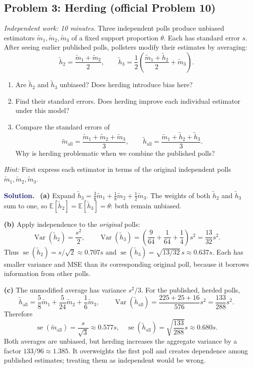 \documentclass[11pt]{article}
\newcommand{\rv}[1]{\widetilde{#1}}
\newcommand{\E}{\mathbb E}
\newcommand{\Var}{\operatorname{Var}}
\newcommand{\se}{\operatorname{se}}
\newenvironment{answer}{\par\medskip\noindent\textcolor{MidnightBlue}{\textbf{Solution.}}\ }{\par\medskip}
\newcommand{\workingspace}[1]{}
\newcommand{\workingspace}[1]{\vspace{#1}}
\begin{document}
\newpage
\subsection*{Problem 3: Herding (official Problem 10)}
\noindent\textit{Independent work: 10 minutes.}
Three independent polls produce unbiased estimators
$\rv m_1,\rv m_2,\rv m_3$ of a fixed support proportion $\theta$.
Each has standard error $s$. After seeing earlier published polls,
pollsters modify their estimates by averaging:
\[
 \rv h_2=\frac{\rv m_1+\rv m_2}{2},\qquad
 \rv h_3=\frac12\left(\frac{\rv m_1+\rv h_2}{2}+\rv m_3\right).
\]
\begin{enumerate}
 \item Are $\rv h_2$ and $\rv h_3$ unbiased? Does herding introduce bias here?
 \item Find their standard errors. Does herding improve each individual
 estimator under this model?
 \item Compare the standard errors of
 \[
 \rv m_{\mathrm{all}}=\frac{\rv m_1+\rv m_2+\rv m_3}{3},\qquad
 \rv h_{\mathrm{all}}=\frac{\rv m_1+\rv h_2+\rv h_3}{3}.
 \]
 Why is herding problematic when we combine the published polls?
\end{enumerate}
\noindent\textit{Hint:} First express each estimator in terms of the original
independent polls $\rv m_1,\rv m_2,\rv m_3$.
\workingspace{8cm}
\begin{answer}
\textbf{(a)} Expand
$\rv h_3=\tfrac38\rv m_1+\tfrac18\rv m_2+\tfrac12\rv m_3$.
The weights of both $\rv h_2$ and $\rv h_3$ sum to one, so
$\E[\rv h_2]=\E[\rv h_3]=\theta$: both remain unbiased.

\textbf{(b)} Apply independence to the \emph{original} polls:
\[
 \Var(\rv h_2)=\frac{s^2}{2},\qquad
 \Var(\rv h_3)=\left(\frac9{64}+\frac1{64}+\frac14\right)s^2
 =\frac{13}{32}s^2.
\]
Thus $\se(\rv h_2)=s/\sqrt2\approx0.707s$ and
$\se(\rv h_3)=\sqrt{13/32}\,s\approx0.637s$.
Each has smaller variance and MSE than its corresponding original poll,
because it borrows information from other polls.

\textbf{(c)} The unmodified average has variance $s^2/3$.
For the published, herded polls,
\[
 \rv h_{\mathrm{all}}=
 \frac58\rv m_1+\frac5{24}\rv m_2+\frac16\rv m_3,
 \qquad
 \Var(\rv h_{\mathrm{all}})
 =\frac{225+25+16}{576}s^2=\frac{133}{288}s^2.
\]
Therefore
\[
 \boxed{\se(\rv m_{\mathrm{all}})=\frac{s}{\sqrt3}\approx0.577s,
 \quad \se(\rv h_{\mathrm{all}})=\sqrt{\frac{133}{288}}s\approx0.680s.}
\]
Both averages are unbiased, but herding increases the aggregate variance by
a factor $133/96\approx1.385$. It overweights the first poll and creates
dependence among published estimates; treating them as independent would be wrong.
\end{answer}
\end{document}
